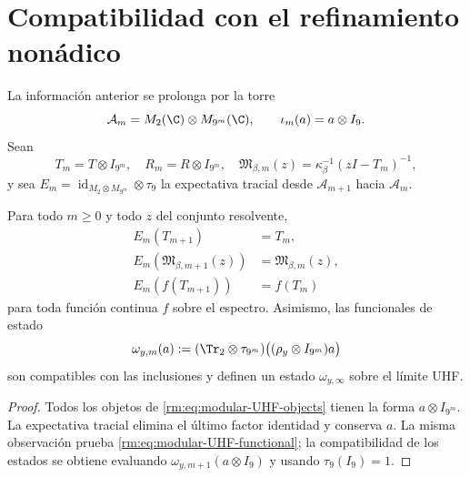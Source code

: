\section{Compatibilidad con el refinamiento non\'adico}

La informaci\'on anterior se prolonga por la torre
\begin{equation}
 \mathcal A_m=M_2(\C)\otimes M_{9^m}(\C),
 \qquad
 \iota_m(a)=a\otimes I_9.
 \label{rm:eq:modular-UHF-tower}
\end{equation}
Sean
\begin{equation}
 T_m=T\otimes I_{9^m},
 \quad
 R_m=R\otimes I_{9^m},
 \quad
 \mathfrak M_{\beta,m}(z)
 =\kappa_\beta^{-1}(zI-T_m)^{-1},
 \label{rm:eq:modular-UHF-objects}
\end{equation}
y sea
\(E_m=\operatorname{id}_{M_2\otimes M_{9^m}}\otimes\tau_9\) la
expectativa tracial desde \(\mathcal A_{m+1}\) hacia \(\mathcal A_m\).

\begin{theorem}
\label{rm:thm:modular-UHF-naturality}
Para todo \(m\geq0\) y todo \(z\) del conjunto resolvente,
\begin{align}
 E_m(T_{m+1})&=T_m,
 \label{rm:eq:modular-UHF-T}\\
 E_m\!\left(\mathfrak M_{\beta,m+1}(z)\right)
 &=\mathfrak M_{\beta,m}(z),
 \label{rm:eq:modular-UHF-resolvent}\\
 E_m\!\left(f(T_{m+1})\right)&=f(T_m)
 \label{rm:eq:modular-UHF-functional}
\end{align}
para toda funci\'on continua \(f\) sobre el espectro. Asimismo, las
funcionales de estado
\begin{equation}
 \omega_{y,m}(a)
 :=(\Tr_2\otimes\tau_{9^m})
 \bigl((\rho_y\otimes I_{9^m})a\bigr)
 \label{rm:eq:modular-UHF-state}
\end{equation}
son compatibles con las inclusiones y definen un estado \(\omega_{y,\infty}\)
sobre el l\'imite UHF.
\end{theorem}

\begin{proof}
Todos los objetos de \cref{rm:eq:modular-UHF-objects} tienen la forma
\(a\otimes I_{9^m}\). La expectativa tracial elimina el \'ultimo factor
identidad y conserva \(a\). La misma observaci\'on prueba
\cref{rm:eq:modular-UHF-functional}; la compatibilidad de los estados se
obtiene evaluando \(\omega_{y,m+1}(a\otimes I_9)\) y usando
\(\tau_9(I_9)=1\).
\end{proof}

